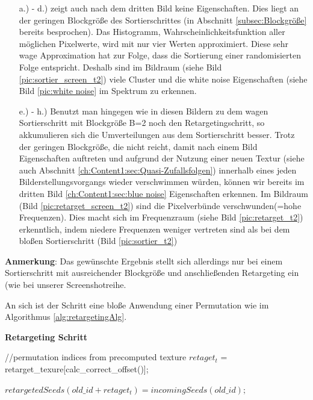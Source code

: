 \begin{itemize}
    \item[a.) - d.)] zeigt auch nach dem dritten Bild keine  Eigenschaften.
                     Dies liegt an der geringen Blockgröße des Sortierschrittes 
                     (in Abschnitt \ref{subsec:Blockgröße} bereits besprochen). Das Histogramm, Wahrscheinlichkeitsfunktion
                     aller möglichen Pixelwerte, wird mit nur vier Werten approximiert. Diese sehr wage Approximation 
                     hat zur Folge, dass die Sortierung einer randomisierten Folge entspricht. Deshalb sind im Bildraum
                     (siehe Bild \ref{pic:sortier_screen_t2}) viele Cluster und die white noise Eigenschaften 
                     (siehe Bild \ref{pic:white noise} im Spektrum zu erkennen.
                     \par 
                    
    \item[e.) - h.)] Benutzt man hingegen wie in diesen Bildern zu dem wagen Sortierschritt mit Blockgröße B=2 noch den Retargetingschritt, so akkumulieren sich die 
                    Umverteilungen aus dem Sortierschritt besser. Trotz der geringen Blockgröße, die nicht reicht, damit nach einem 
                    Bild  Eigenschaften auftreten und aufgrund der Nutzung einer neuen 
                    Textur (siehe auch Abschnitt \ref{ch:Content1:sec:Quasi-Zufallsfolgen}) innerhalb eines jeden 
                    Bilderstellungsvorgangs wieder verschwimmen würden, können wir bereits im dritten Bild 
                    \ref{ch:Content1:sec:blue noise} Eigenschaften erkennen. Im Bildraum (Bild \ref{pic:retarget_screen_t2})
                    sind die Pixelverbünde verschwunden(=hohe Frequenzen). Dies macht sich im Frequenzraum 
                    (siehe Bild \ref{pic:retarget_t2}) erkenntlich, indem niedere Frequenzen weniger vertreten sind 
                    als bei dem bloßen Sortierschritt (Bild \ref{pic:sortier_t2})
\end{itemize}

\textbf{Anmerkung}: Das gewünschte Ergebnis stellt sich allerdings nur bei einem Sortierschritt mit ausreichender Blockgröße und 
anschließenden Retargeting ein (wie bei unserer Screenshotreihe.

An sich ist der Schritt eine bloße Anwendung einer Permutation wie im Algorithmus \ref{alg:retargetingAlg}.

\begin{tcolorbox}
\begin{algorithm}[H]
    \caption{\textbf{Retargeting Schritt}}
    \begin{algorithmic}[1]
        \State //permutation indices from precomputed texture
        \State $retaget_{t}$ = retarget\_texure[calc\_correct\_offset()];
        
        \State $retargetedSeeds(old\_id + retaget_{t}) = incomingSeeds(old\_id);$
        
    \end{algorithmic}
    \label{alg:retargetingAlg}
\end{algorithm}
\end{tcolorbox}

